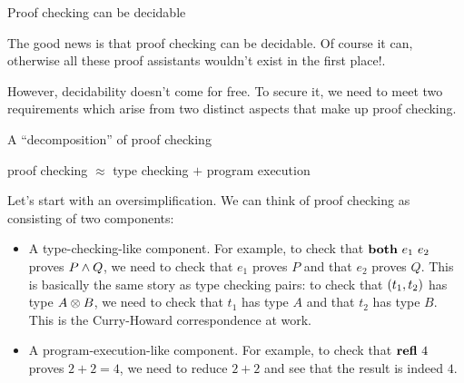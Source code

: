 \documentclass{beamer}
\begin{document}
\begin{frame}{Proof checking can be decidable}

The good news is that proof checking can be decidable. Of course it can, otherwise all these proof assistants wouldn't exist in the first place!.

\vspace{2em}

However, decidability doesn't come for free. To secure it, we need to meet two requirements which arise from two distinct aspects that make up proof checking.

\end{frame}

\begin{frame}{A ``decomposition'' of proof checking}

\begin{center}
  proof checking $\approx$ type checking $+$ program execution
\end{center}

\vspace{1em}

Let's start with an oversimplification. We can think of proof checking as consisting of two components:

\begin{itemize}
  \item A type-checking-like component. For example, to check that $\textbf{both}\ e_1\ e_2$ proves $P \land Q$, we need to check that $e_1$ proves $P$ and that $e_2$ proves $Q$. This is basically the same story as type checking pairs: to check that $(t_1, t_2)$ has type $A \otimes B$, we need to check that $t_1$ has type $A$ and that $t_2$ has type $B$. This is the Curry-Howard correspondence at work.
  \item A program-execution-like component. For example, to check that $\refl[4]$ proves $2 + 2 = 4$, we need to reduce $2 + 2$ and see that the result is indeed $4$.
\end{itemize}

\end{frame}
\end{document}
